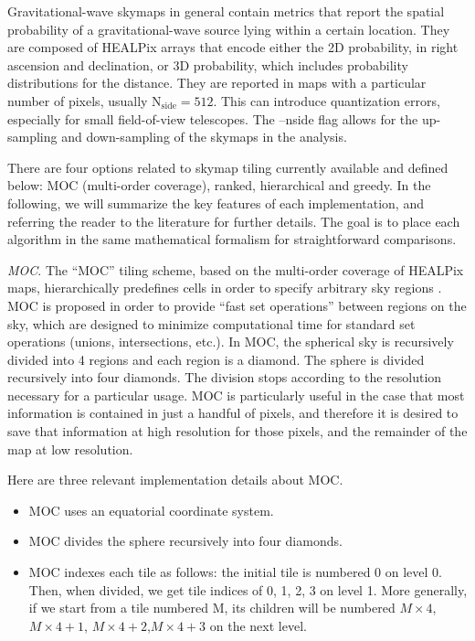 \documentclass[twocolumn]{aastex62}
\begin{document}
Gravitational-wave skymaps in general contain metrics that report the spatial probability of a gravitational-wave source lying within a certain location.
They are composed of HEALPix arrays that encode either the 2D probability, in right ascension and declination, or 3D probability, which includes probability distributions for the distance.
They are reported in maps with a particular number of pixels, usually $\textrm{N}_\textrm{side} = 512$. 
This can introduce quantization errors, especially for small field-of-view telescopes. 
The --nside flag allows for the up-sampling and down-sampling of the skymaps in the analysis.

There are four options related to skymap tiling currently available and defined below: MOC (multi-order coverage), ranked, hierarchical and greedy.
In the following, we will summarize the key features of each implementation, and referring the reader to the literature for further details.
The goal is to place each algorithm in the same mathematical formalism for straightforward comparisons.

\emph{MOC}. The ``MOC'' tiling scheme, based on the multi-order coverage of HEALPix maps, hierarchically predefines cells in order to specify arbitrary sky regions \citep{FeBo2014}. 
MOC is proposed in order to provide ``fast set operations'' between regions on the sky, which are designed to minimize computational time for standard set operations (unions, intersections, etc.). In MOC, the spherical sky is recursively divided into 4 regions and each region is a diamond. 
The sphere is divided recursively into four diamonds. 
The division stops according to the resolution necessary for a particular usage.
MOC is particularly useful in the case that most information is contained in just a handful of pixels, and therefore it is desired to save that information at high resolution for those pixels, and the remainder of the map at low resolution.

Here are three relevant implementation details about MOC.
\begin{itemize}
\item MOC uses an equatorial coordinate system. 
\item MOC divides the sphere recursively into four diamonds. 
\item MOC indexes each tile as follows: the initial tile is numbered 0 on level 0. Then, when divided, we get tile indices of 0, 1, 2, 3 on level 1. More generally, if we start from a tile numbered M, its children will be numbered $M\times 4$, $M\times 4 + 1$, $M\times 4 + 2$,$M\times 4 + 3$ on the next level.
\end{itemize}
\end{document}

